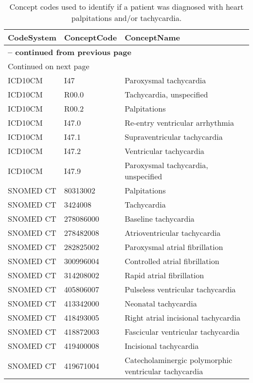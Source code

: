 \begin{longtable}{p{}p{}p{}}
\caption{Concept codes used to identify if a patient was diagnosed with heart palpitations and/or tachycardia.} \\ 
 CodeSystem & ConceptCode & ConceptName \\ 
  \hline 
\endfirsthead 
\multicolumn{3}{p{\textwidth}}{{ \bfseries \tablename \thetable{} -- continued from previous page}} \ 
\hline CodeSystem & ConceptCode & ConceptName \\ \hline 
\endhead 
\hline \multicolumn{3}{p{\textwidth}}{{Continued on next page}} \\ \hline 
\endfoot 
\hline 
\endlastfoot 
 \hline
ICD10CM & I47 & Paroxysmal tachycardia \\ 
  ICD10CM & R00.0 & Tachycardia, unspecified \\ 
  ICD10CM & R00.2 & Palpitations \\ 
  ICD10CM & I47.0 & Re-entry ventricular arrhythmia \\ 
  ICD10CM & I47.1 & Supraventricular tachycardia \\ 
  ICD10CM & I47.2 & Ventricular tachycardia \\ 
  ICD10CM & I47.9 & Paroxysmal tachycardia, unspecified \\ 
  SNOMED CT & 80313002 & Palpitations \\ 
  SNOMED CT & 3424008 & Tachycardia \\ 
  SNOMED CT & 278086000 & Baseline tachycardia \\ 
  SNOMED CT & 278482008 & Atrioventricular tachycardia \\ 
  SNOMED CT & 282825002 & Paroxysmal atrial fibrillation \\ 
  SNOMED CT & 300996004 & Controlled atrial fibrillation \\ 
  SNOMED CT & 314208002 & Rapid atrial fibrillation \\ 
  SNOMED CT & 405806007 & Pulseless ventricular tachycardia \\ 
  SNOMED CT & 413342000 & Neonatal tachycardia \\ 
  SNOMED CT & 418493005 & Right atrial incisional tachycardia \\ 
  SNOMED CT & 418872003 & Fascicular ventricular tachycardia \\ 
  SNOMED CT & 419400008 & Incisional tachycardia \\ 
  SNOMED CT & 419671004 & Catecholaminergic polymorphic ventricular tachycardia \\ 

\end{longtable}
